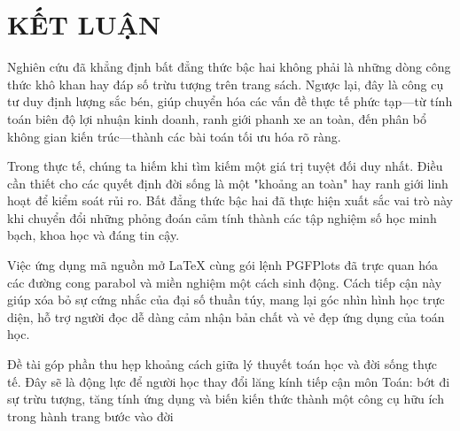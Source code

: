 \documentclass[14pt, a4paper, oneside]{extreport}
\begin{document}
\clearpage

\section*{\centering KẾT LUẬN}

Nghiên cứu đã khẳng định bất đẳng thức bậc hai không phải là những dòng công thức khô khan hay đáp số trừu tượng trên trang sách. Ngược lại, đây là công cụ tư duy định lượng sắc bén, giúp chuyển hóa các vấn đề thực tế phức tạp—từ tính toán biên độ lợi nhuận kinh doanh, ranh giới phanh xe an toàn, đến phân bổ không gian kiến trúc—thành các bài toán tối ưu hóa rõ ràng.   


Trong thực tế, chúng ta hiếm khi tìm kiếm một giá trị tuyệt đối duy nhất. Điều cần thiết cho các quyết định đời sống là một "khoảng an toàn" hay ranh giới linh hoạt để kiểm soát rủi ro. Bất đẳng thức bậc hai đã thực hiện xuất sắc vai trò này khi chuyển đổi những phỏng đoán cảm tính thành các tập nghiệm số học minh bạch, khoa học và đáng tin cậy.   


Việc ứng dụng mã nguồn mở LaTeX cùng gói lệnh PGFPlots đã trực quan hóa các đường cong parabol và miền nghiệm một cách sinh động. Cách tiếp cận này giúp xóa bỏ sự cứng nhắc của đại số thuần túy, mang lại góc nhìn hình học trực diện, hỗ trợ người đọc dễ dàng cảm nhận bản chất và vẻ đẹp ứng dụng của toán học.   


Đề tài góp phần thu hẹp khoảng cách giữa lý thuyết toán học và đời sống thực tế. Đây sẽ là động lực để người học thay đổi lăng kính tiếp cận môn Toán: bớt đi sự trừu tượng, tăng tính ứng dụng và biến kiến thức thành một công cụ hữu ích trong hành trang bước vào đời
\end{document}
